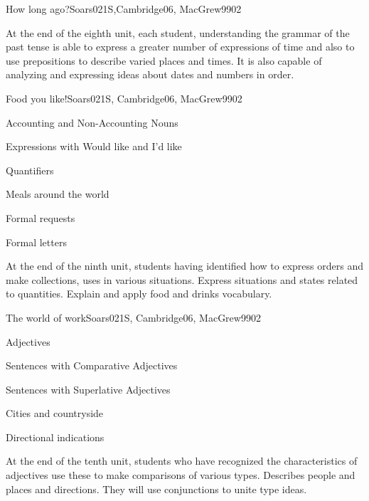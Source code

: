 \begin{syllabus}
\begin{unit}{How long ago?}{}{Soars021S,Cambridge06, MacGrew99}{0}{2}
   \begin{learningoutcomes}
      \item At the end of the eighth unit, each student, understanding the grammar of the past tense is able to express a greater number of expressions of time and also to use prepositions to describe varied places and times. It is also capable of analyzing and expressing ideas about dates and numbers in order. 
   \end{learningoutcomes}

\end{unit}

\begin{unit}{Food you like!}{}{Soars021S, Cambridge06, MacGrew99}{0}{2}
   \begin{topics}
      \item Accounting and Non-Accounting Nouns
      \item Expressions with Would like and I'd like
      \item Quantifiers
      \item Meals around the world
      \item Formal requests
      \item Formal letters
   \end{topics}

   \begin{learningoutcomes}
      \item At the end of the ninth unit, students having identified how to express orders and make collections, uses in various situations. Express situations and states related to quantities. Explain and apply food and drinks vocabulary.
   \end{learningoutcomes}
\end{unit}

\begin{unit}{The world of work}{}{Soars021S, Cambridge06, MacGrew99}{0}{2}
   \begin{topics}
      \item Adjectives
      \item Sentences with Comparative Adjectives
      \item Sentences with Superlative Adjectives
      \item Cities and countryside
      \item Directional indications
   \end{topics}

   \begin{learningoutcomes}
      \item At the end of the tenth unit, students who have recognized the characteristics of adjectives use these to make comparisons of various types. Describes people and places and directions. They will use conjunctions to unite type ideas.
   \end{learningoutcomes}


\end{unit}
\end{syllabus}
